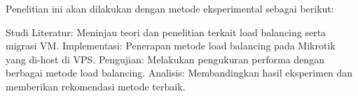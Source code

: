 Penelitian ini akan dilakukan dengan metode eksperimental sebagai berikut:

    Studi Literatur: Meninjau teori dan penelitian terkait load balancing serta migrasi VM.
    Implementasi: Penerapan metode load balancing pada Mikrotik yang di-host di VPS.
    Pengujian: Melakukan pengukuran performa dengan berbagai metode load balancing.
    Analisis: Membandingkan hasil eksperimen dan memberikan rekomendasi metode terbaik.
